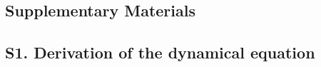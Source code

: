 \documentclass[twocolumn,prl,floatfix,citeautoscript,nofootinbib,superscriptaddress]{revtex4}
\begin{document}
\newpage

\begin{widetext}
\setcounter{figure}{0} \renewcommand{\thefigure}{S\arabic{figure}} %
\setcounter{equation}{0} \renewcommand{\theequation}{S\arabic{equation}}


\section{Supplementary Materials}
\setcounter{figure}{0} \renewcommand{\thefigure}{S\arabic{figure}} %
\setcounter{equation}{0} \renewcommand{\theequation}{S\arabic{equation}}

\subsection{S1. Derivation of the dynamical equation}


\end{widetext}
\end{document}
